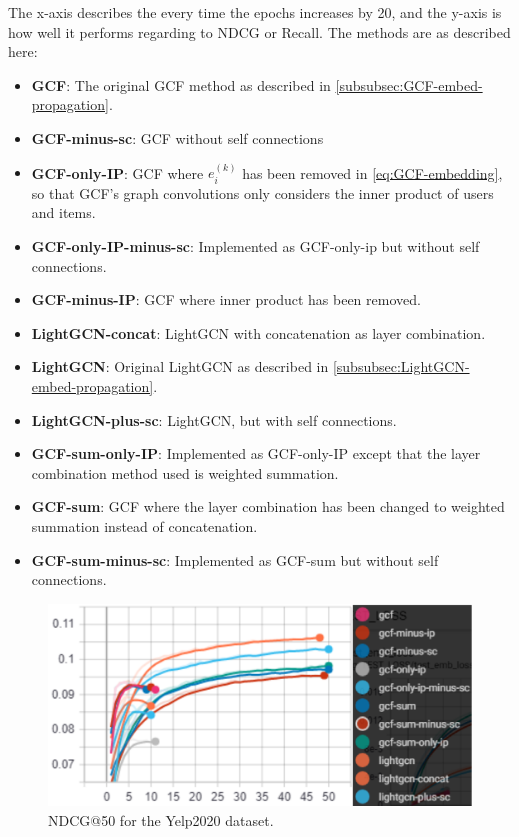 The x-axis describes the every time the epochs increases by 20, and the y-axis is how well it performs regarding to NDCG or Recall.
The methods are as described here:\\
\begin{itemize}
    \item \textbf{GCF}: The original GCF method as described in \autoref{subsubsec:GCF-embed-propagation}.
    \item \textbf{GCF-minus-sc}: GCF without self connections
    \item \textbf{GCF-only-IP}:  GCF where $e_i^{(k)}$ has been removed in \autoref{eq:GCF-embedding}, so that GCF's graph convolutions only considers the inner product of users and items.
    \item \textbf{GCF-only-IP-minus-sc}: Implemented as GCF-only-ip but without self connections.
    \item \textbf{GCF-minus-IP}: GCF where inner product has been removed.
    \item \textbf{LightGCN-concat}: LightGCN with concatenation as layer combination.
    \item \textbf{LightGCN}: Original LightGCN as described in \autoref{subsubsec:LightGCN-embed-propagation}.
    \item \textbf{LightGCN-plus-sc}: LightGCN, but with self connections.
    \item \textbf{GCF-sum-only-IP}: Implemented as GCF-only-IP except that the layer combination method used is weighted summation.
    \item \textbf{GCF-sum}: GCF where the layer combination has been changed to weighted summation instead of concatenation.
    \item \textbf{GCF-sum-minus-sc}: Implemented as GCF-sum but without self connections.
\end{itemize}
\begin{figure}[h!]
    \includegraphics[width=\linewidth]{figures/gcf-all-ndcg.png}
    \caption{NDCG@50 for the Yelp2020 dataset.}
    \label{fig:GCF-NDCG-ablation-study}
\end{figure}
